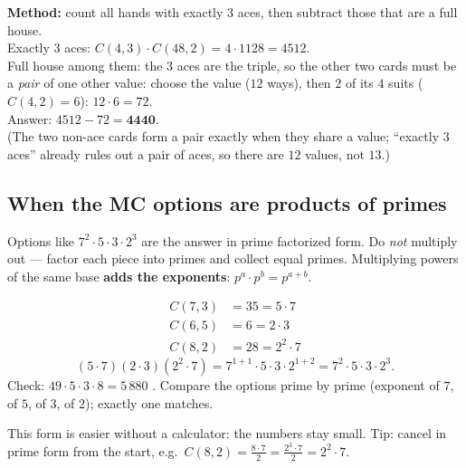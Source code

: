 \documentclass{fkt-notes}
\theoremstyle{definition}
\begin{document}
\begin{example}
  \textbf{Method:} count all hands with exactly $3$ aces, then subtract
  those that are a full house.\\
  Exactly $3$ aces: $C(4,3)\cdot C(48,2)=4\cdot1128=4512$.\\
  Full house among them: the $3$ aces are the triple, so the other two
  cards must be a \emph{pair} of one other value: choose the value
  ($12$ ways), then $2$ of its $4$ suits ($C(4,2)=6$):
  $12\cdot6=72$.\\
  Answer: $4512-72=\mathbf{4440}$.\\
  (The two non-ace cards form a pair exactly when they share a value;
  ``exactly $3$ aces'' already rules out a pair of aces, so there are
  $12$ values, not $13$.)
\end{example}

\subsection{When the MC options are products of primes}
Options like $7^2 \cdot 5 \cdot 3 \cdot 2^3$ are the answer in prime
factorized form. Do \emph{not} multiply out --- factor each piece into
primes and collect equal primes. Multiplying powers of the same base
\textbf{adds the exponents}: $p^a \cdot p^b = p^{a+b}$.

\begin{example}
  \begin{align*}
    C(7, 3) & = 35 = 5 \cdot 7   \\
    C(6, 5) & = 6 = 2 \cdot 3    \\
    C(8, 2) & = 28 = 2^2 \cdot 7
  \end{align*}
  \[
    (5 \cdot 7)(2 \cdot 3)(2^2 \cdot 7)
    = 7^{1+1} \cdot 5 \cdot 3 \cdot 2^{1+2}
    = 7^2 \cdot 5 \cdot 3 \cdot 2^3.
  \]
  Check: $49 \cdot 5 \cdot 3 \cdot 8 = 5\,880$ \checkmark.
  Compare the options prime by prime (exponent of $7$, of $5$, of
  $3$, of $2$); exactly one matches.
\end{example}

\noindent This form is easier without a calculator: the numbers stay
small. Tip: cancel in prime form from the start, e.g.\
$C(8, 2) = \frac{8 \cdot 7}{2} = \frac{2^3 \cdot 7}{2} = 2^2 \cdot 7$.
\end{document}
